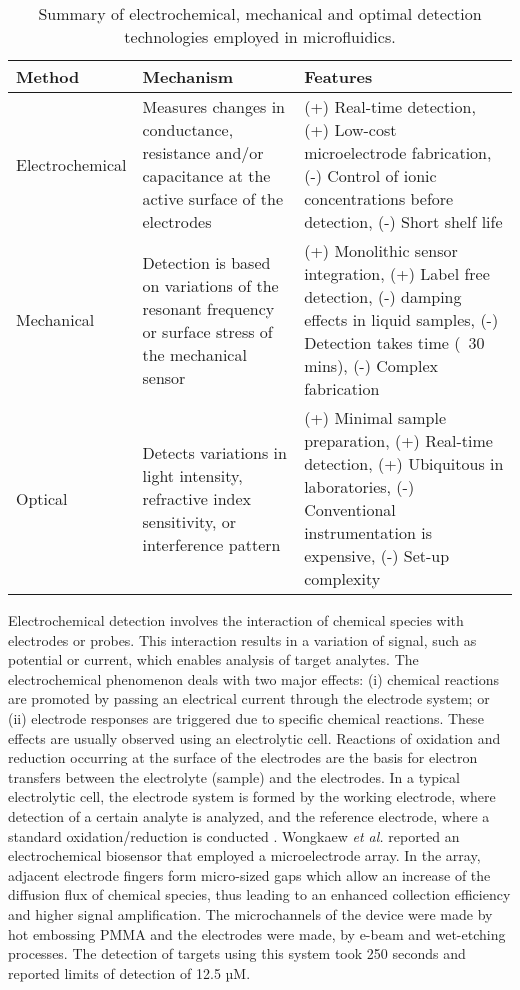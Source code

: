 \newpage

\begin{table}
\begin{center}
    \label{tab:detectors}
    \begin{tabular}{|p{3cm}||p{5cm}||p{5.3cm}|}\hline\hline
      Method & Mechanism & Features \\ \hline
      Electrochemical & Measures changes in conductance, resistance and/or capacitance at the active surface of the electrodes  &
      (+) Real-time detection, (+) Low-cost microelectrode fabrication, (-) Control of ionic concentrations before detection, (-) Short shelf life  \\ \hline
      Mechanical & Detection is based on variations of the resonant frequency or surface stress of the mechanical sensor &
      (+) Monolithic sensor integration, (+) Label free detection, (-) damping effects in liquid samples, (-) Detection takes time (~30 mins), (-) Complex fabrication  \\ \hline
      Optical & Detects variations in light intensity, refractive index sensitivity, or interference pattern &
      (+) Minimal sample preparation, (+) Real-time detection, (+) Ubiquitous in laboratories, (-) Conventional instrumentation is expensive, (-) Set-up complexity \\ \hline\hline
    \end{tabular}
\caption{Summary of electrochemical, mechanical and optimal detection technologies employed in microfluidics.}
\end{center}
\end{table}

Electrochemical detection involves the interaction of chemical species with electrodes or probes. This interaction
results in a variation of signal, such as potential or current, which enables analysis of target analytes. The
electrochemical phenomenon deals with two major effects: (i) chemical reactions are promoted by passing an
electrical current through the electrode system; or (ii) electrode responses are triggered due to specific chemical reactions. These
effects are usually observed using an electrolytic cell. Reactions of oxidation and reduction occurring at the surface of the electrodes
are the basis for electron transfers between the electrolyte (sample) and the electrodes. In a typical
electrolytic cell, the electrode system is formed by the working electrode, where detection of a certain
analyte is analyzed, and the reference electrode, where a standard oxidation/reduction is conducted \citep{flanagan2005electrochemical}.
Wongkaew \textit{et al.} reported an electrochemical biosensor that employed a microelectrode array. In
the array, adjacent electrode fingers form micro-sized gaps which allow an increase of the diffusion flux
of chemical species, thus leading to an enhanced collection efficiency and higher signal amplification.
The microchannels of the device were made by hot embossing PMMA and the electrodes were made, by e-beam
and wet-etching processes. The detection of targets using this system took 250 seconds and reported
limits of detection of 12.5 µM.

